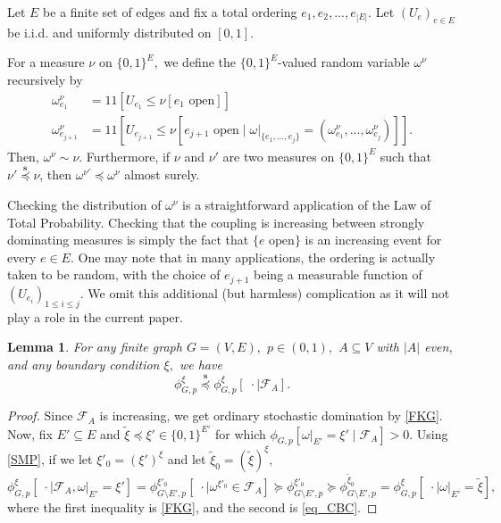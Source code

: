 \documentclass[article,11pt,reqno]{amsart}
\newcommand{\id}{1\! \!1}
\newtheorem{lemma}[theorem]{Lemma}
\begin{document}
\begin{appendix}
\begin{mdframed}[style=MyFrame]
Let $E$ be a finite set of edges and fix a total ordering $e_1,e_2,...,e_{|E|}$. Let $(U_e)_{e\in E}$ be i.i.d. and uniformly distributed on $[0,1]$.

For a measure $\nu$ on $\{0,1\}^E,$ we define the $\{0,1\}^E$-valued random variable $\omega^{\nu}$ recursively by
\begin{align*}
\omega^{\nu}_{e_1}&=\id[U_{e_1}\leq \nu[e_1\text{ open}]]\\
\omega^{\nu}_{e_{j+1}}&=\id[U_{e_{j+1}}\leq \nu[e_{j+1}\text{ open}\mid \omega|_{\{e_1,...,e_j\}}=(\omega^{\nu}_{e_1},...,\omega^{\nu}_{e_j})]].
\end{align*}
Then, $\omega^{\nu}\sim \nu$. Furthermore, if $\nu$ and $\nu'$ are two measures on $\{0,1\}^E$ such that $\nu'\overset{\mathbf{s}}{\preceq} \nu$, then $\omega^{\nu'}\preceq \omega^{\nu}$ almost surely.
\end{mdframed}

\vspace{0.3cm} Checking the distribution of $\omega^{\nu}$ is a straightforward application of the Law of Total Probability. Checking that the coupling is increasing between strongly dominating measures is simply the fact that $\{e \text{ open}\}$ is an increasing event for every $e\in E$. One may note that in many applications, the ordering is actually taken to be random, with the choice of $e_{j+1}$ being a measurable function of $(U_{e_i})_{1\leq i\leq j}$. We omit this additional (but harmless) complication as it will not play a role in the current paper.
\begin{lemma} \label{lemma:FA_dom}
For any finite graph $G=(V,E),$ $p\in(0,1),$ $A\subseteq V$ with $|A|$ even, and any boundary condition $\xi,$ we have
$$\phi^\xi_{G,p} \overset{\mathbf{s}}{\preceq} \phi^\xi_{G,p}[\;\cdot \mid \mathcal{F}_A].$$
\end{lemma}
\begin{proof}
Since $\mathcal{F}_A$ is increasing, we get ordinary stochastic domination by \eqref{FKG}. Now, fix $E'\subseteq E$ and $\tilde \xi\preceq \xi'\in \{0,1\}^{E'}$ for which $\phi_{G,p}[\omega|_{E'}=\xi'\mid \mathcal{F}_A]>0$.  
Using \eqref{SMP}, if we let $\xi'_0=(\xi')^{\xi}$ and let $\tilde{\xi}_0=(\tilde{\xi})^{\xi},$
$$
\phi^\xi_{G,p}[\; \cdot \mid \mathcal{F}_A,\omega|_{E'}=\xi']=\phi_{G\setminus E',p}^{\xi'_0}[\;\cdot \mid \omega^{\xi'_0}\in \mathcal{F}_{A}]\succeq \phi^{\xi'_0}_{G\setminus E',p}\succeq \phi^{\tilde \xi_0}_{G\setminus E',p}=\phi^\xi_{G,p}[\;\cdot \mid \omega|_{E'}=\tilde \xi],
$$
where the first inequality is \eqref{FKG}, and the second is \eqref{eq_CBC}. %
\end{proof}


\end{appendix}
\end{document}
